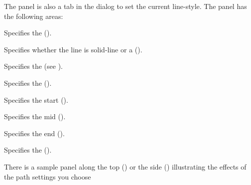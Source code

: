 
The  panel is also a tab
in the  dialog to set the current
\gls{line-style}. The panel has the following areas:
\begin{deflist}
\begin{itemdesc}
Specifies the  ().
\end{itemdesc}

\begin{itemdesc}
Specifies whether the line is \gls{solid-line} or a 
().
\end{itemdesc}

\begin{itemdesc}
Specifies the  (see ).
\end{itemdesc}

\begin{itemdesc}
Specifies the  ().
\end{itemdesc}

\begin{itemdesc}
Specifies the start  ().
\end{itemdesc}

\begin{itemdesc}
Specifies the mid  ().
\end{itemdesc}

\begin{itemdesc}
Specifies the end  ().
\end{itemdesc}

\begin{itemdesc}
Specifies the  ().
\end{itemdesc}

\end{deflist}

There is a sample panel along the top ()
or the side () illustrating the
effects of the \gls{path} settings you choose

